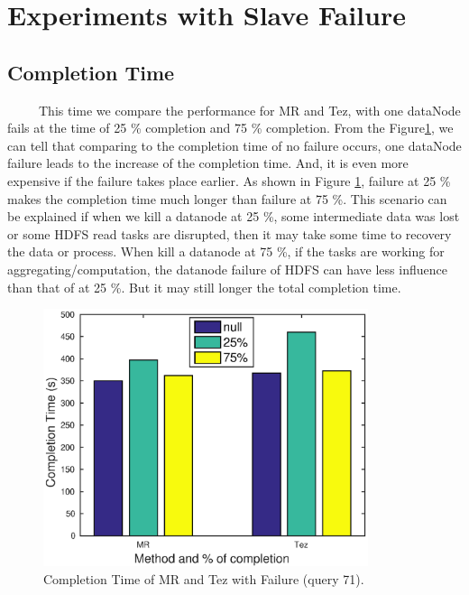\documentclass[10pt]{article}
\begin{document}


\section{Experiments with Slave Failure}
\subsection{Completion Time}

~~~~~This time we compare the performance for MR and Tez, with one dataNode fails at the time of 25 \% completion and 75 \% completion. From the Figure\ref{fig:q3a_time}, we can tell that comparing to the completion time of no failure occurs, one dataNode failure leads to the increase of the completion time. And, it is even more expensive if the failure takes place earlier. As shown in Figure \ref{fig:q3a_time}, failure at 25 \% makes the completion time much longer than failure at 75 \%. This scenario can be explained if when we kill a datanode at 25 \%, some intermediate data was lost or some HDFS read tasks are disrupted, then it may take some time to recovery the data or process. When kill a datanode at 75 \%, if the tasks are working for aggregating/computation, the datanode failure of HDFS can have less influence than that of at 25 \%. But it may still longer the total completion time.


\begin{figure}
\begin{center}
\includegraphics[width=0.85\textwidth]{pic/q3a_time}
\caption{Completion Time of MR and Tez with Failure (query 71).}
\label{fig:q3a_time}
\end{center}
\end{figure}



%

%

\end{document}
